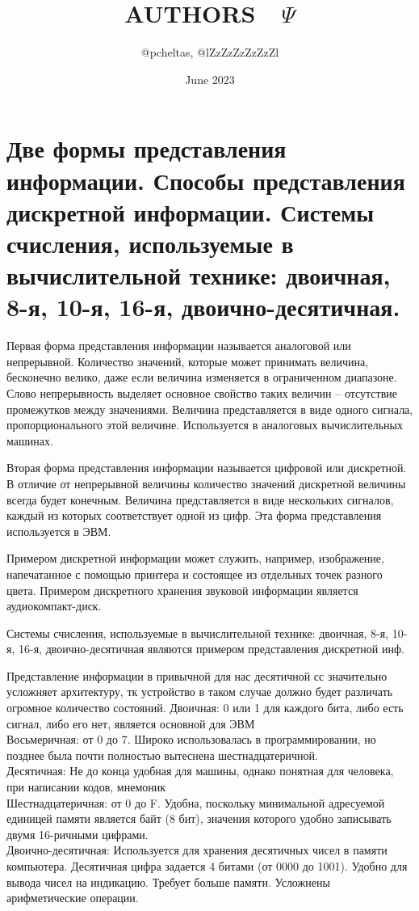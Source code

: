 \documentclass{article}
\title{AUTHORS\ \ $\Psi  $}
\author{@pcheltas, @lZzZzZzZzZzZl}
\date{June 2023}
\begin{document}
\maketitle
\newpage
\section{Две формы представления информации. Способы представления дискретной информации. Системы счисления, используемые в вычислительной технике: двоичная, 8-я, 10-я, 16-я, двоично-десятичная.}


Первая форма представления информации называется аналоговой или непрерывной. Количество значений, которые может принимать величина, бесконечно велико, даже если величина изменяется в ограниченном диапазоне. 
Слово непрерывность выделяет основное свойство таких величин – отсутствие промежутков между значениями. Величина представляется в виде одного сигнала, пропорционального этой величине. Используется в аналоговых вычислительных машинах.


Вторая форма представления информации называется цифровой или дискретной.
В отличие от непрерывной величины количество значений дискретной величины всегда будет конечным. Величина представляется в виде нескольких сигналов, каждый из которых соответствует одной из цифр.
Эта форма представления используется в ЭВМ.


Примером дискретной информации может служить, например, изображение, напечатанное с помощью принтера и состоящее из отдельных точек разного цвета. 
Примером дискретного хранения звуковой информации является аудиокомпакт-диск.


Системы счисления, используемые в вычислительной технике: двоичная, 8-я, 10-я, 16-я, двоично-десятичная являются примером представления дискретной инф.

Представление информации в привычной для нас десятичной сс значительно усложняет архитектуру, тк устройство в таком случае должно будет различать огромное количество состояний.
Двоичная: 0 или 1 для каждого бита, либо есть сигнал, либо его нет, является основной для ЭВМ\\
Восьмеричная: от 0 до 7. Широко использовалась в программировании, но позднее была почти полностью вытеснена шестнадцатеричной.\\
Десятичная: Не до конца удобная для машины, однако понятная для человека, при написании кодов, мнемоник\\
Шестнадцатеричная: от 0 до F. Удобна, поскольку минимальной адресуемой единицей памяти является байт (8 бит), значения которого удобно записывать двумя 16-ричными цифрами. \\
Двоично-десятичная: Используется для хранения десятичных чисел в памяти компьютера. Десятичная цифра задается 4 битами (от 0000 до 1001).
Удобно для вывода чисел на индикацию. Требует больше памяти. Усложнены арифметические операции.
\end{document}
